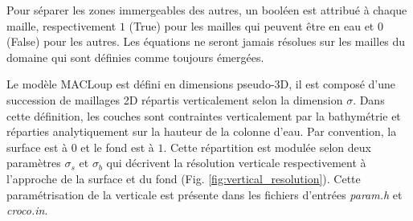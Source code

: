 \documentclass[10pt,a4paper,titlepage]{article}
\begin{document}
Pour séparer les zones immergeables des autres, un booléen est attribué à chaque maille, respectivement $1$ (True) pour les mailles qui peuvent être en eau et $0$ (False) pour les autres.
Les équations ne seront jamais résolues sur les mailles du domaine qui sont définies comme toujours émergées.

Le modèle MACLoup est défini en dimensions pseudo-3D, il est composé d'une succession de maillages 2D répartis verticalement selon la dimension $\sigma$.
Dans cette définition, les couches sont contraintes verticalement par la bathymétrie et réparties analytiquement sur la hauteur de la colonne d'eau.
Par convention, la surface est à $0$ et le fond est à $1$.
Cette répartition est modulée selon deux paramètres $\sigma_{s}$ et $\sigma_{b}$ qui décrivent la résolution verticale respectivement à l'approche de la surface et du fond (Fig. \ref{fig:vertical_resolution}).
Cette paramétrisation de la verticale est présente dans les fichiers d'entrées \textit{param.h} et \textit{croco.in}.
\end{document}
